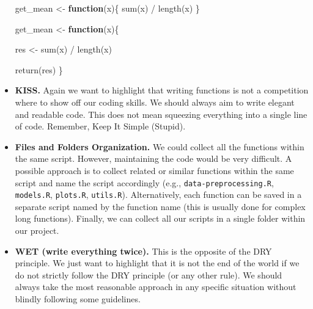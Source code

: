 \documentclass[
  11pt,
]{book}
\newenvironment{Shaded}{\begin{snugshade}}{\end{snugshade}}
\newcommand{\ControlFlowTok}[1]{\textcolor[rgb]{0.13,0.29,0.53}{\textbf{#1}}}
\newcommand{\FunctionTok}[1]{\textcolor[rgb]{0.00,0.00,0.00}{#1}}
\newcommand{\NormalTok}[1]{#1}
\newcommand{\OtherTok}[1]{\textcolor[rgb]{0.56,0.35,0.01}{#1}}
\newcommand{\SpecialCharTok}[1]{\textcolor[rgb]{0.00,0.00,0.00}{#1}}
\newenvironment{code-tex-bad}
  {\begingroup\definecolor{shadecolor}{RGB}{255, 189, 185}}
  {\endgroup}
\newenvironment{code-tex-good}
  {\begingroup\definecolor{shadecolor}{RGB}{224, 240, 227}}
  {\endgroup}
\begin{document}
\begin{itemize}
  \begin{code-tex-bad}

\begin{Shaded}
\begin{Highlighting}[]
\NormalTok{get\_mean }\OtherTok{\textless{}{-}} \ControlFlowTok{function}\NormalTok{(x)\{}
  \FunctionTok{sum}\NormalTok{(x) }\SpecialCharTok{/} \FunctionTok{length}\NormalTok{(x)}
\NormalTok{\}}
\end{Highlighting}
\end{Shaded}

  \end{code-tex-bad}

  \begin{code-tex-good}

\begin{Shaded}
\begin{Highlighting}[]
\NormalTok{get\_mean }\OtherTok{\textless{}{-}} \ControlFlowTok{function}\NormalTok{(x)\{}

\NormalTok{  res }\OtherTok{\textless{}{-}} \FunctionTok{sum}\NormalTok{(x) }\SpecialCharTok{/} \FunctionTok{length}\NormalTok{(x)}

  \FunctionTok{return}\NormalTok{(res)}
\NormalTok{\}}
\end{Highlighting}
\end{Shaded}

  \end{code-tex-good}
\item
  \textbf{KISS.} Again we want to highlight that writing functions is not a competition where to show off our coding skills. We should always aim to write elegant and readable code. This does not mean squeezing everything into a single line of code. Remember, Keep It Simple (Stupid).
\item
  \textbf{Files and Folders Organization.} We could collect all the functions within the same script. However, maintaining the code would be very difficult. A possible approach is to collect related or similar functions within the same script and name the script accordingly (e.g., \texttt{data-preprocessing.R}, \texttt{models.R}, \texttt{plots.R}, \texttt{utils.R}). Alternatively, each function can be saved in a separate script named by the function name (this is usually done for complex long functions). Finally, we can collect all our scripts in a single folder within our project.
\item
  \textbf{WET (write everything twice).} This is the opposite of the DRY principle. We just want to highlight that it is not the end of the world if we do not strictly follow the DRY principle (or any other rule). We should always take the most reasonable approach in any specific situation without blindly following some guidelines.
\end{itemize}
\end{document}
